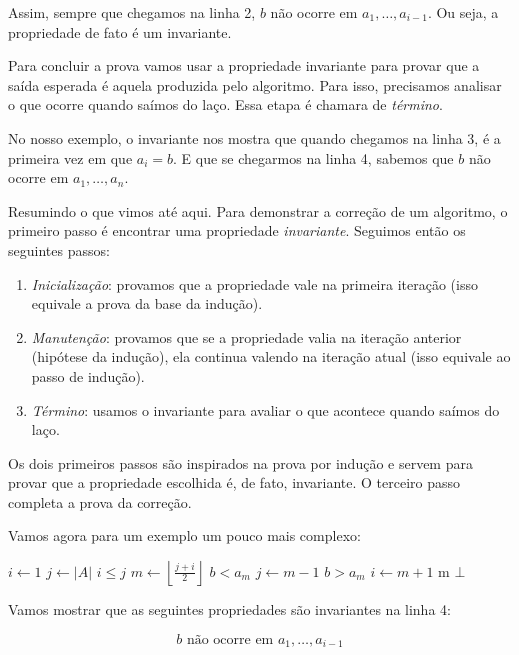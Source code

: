 Assim, sempre que chegamos na linha 2, $b$ não ocorre em $a_1, \dots, a_{i-1}$.
Ou seja, a propriedade de fato é um invariante.

Para concluir a prova vamos usar a propriedade invariante para provar que a saída esperada é aquela produzida pelo algoritmo.
Para isso, precisamos analisar o que ocorre quando saímos do laço.
Essa etapa é chamara de {\em término}.

No nosso exemplo, o invariante nos mostra que quando chegamos na linha 3, é a primeira vez em que $a_i = b$.
E que se chegarmos na linha 4, sabemos que $b$ não ocorre em $a_1, \dots, a_n$.

Resumindo o que vimos até aqui.
Para demonstrar a correção de um algoritmo, o primeiro passo é encontrar uma propriedade {\em invariante}.
Seguimos então os seguintes passos:
\begin{enumerate}
\item {\em Inicialização}: provamos que a propriedade vale na primeira iteração (isso equivale a prova da base da indução).
\item {\em Manutenção}: provamos que se a propriedade valia na iteração anterior (hipótese da indução), ela continua valendo na iteração atual (isso equivale ao passo de indução).
\item {\em Término}: usamos o invariante para avaliar o que acontece quando saímos do laço.
\end{enumerate}

Os dois primeiros passos são inspirados na prova por indução e servem para provar que a propriedade escolhida é, de fato, invariante.
O terceiro passo completa a prova da correção.


Vamos agora para um exemplo um pouco mais complexo:


\begin{codebox}
  \li $i \gets 1$
  \li $j \gets |A|$
  \li \While $i \leq j$
  \li \Do $m \gets \left \lfloor{\frac{j+i}{2}}\right\rfloor$
  \li \If $b < a_m$
  \li     \Then $j \gets m - 1$
  \li \Else
      \If $b > a_m$
  \li      \Then $i \gets m + 1$
  \li \Else \Return m 
      \End
  \End
  \End
  \li \Return $\bot$
\end{codebox}

Vamos mostrar que as seguintes propriedades são invariantes na linha 4:

\begin{displaymath}
b \textrm{ não ocorre em } a_1, \dots, a_{i-1}
\end{displaymath}

